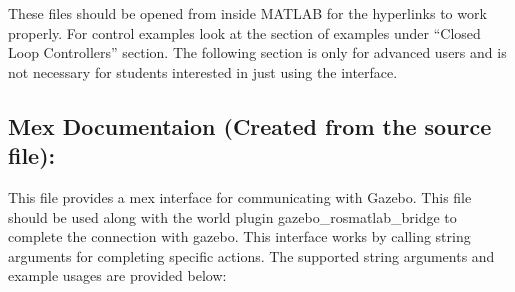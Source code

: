 \documentclass[letterpaper,10pt]{article}
\begin{document}
These files should be opened from inside MATLAB for the hyperlinks to work properly. For control examples look at the section of examples under ``Closed Loop Controllers'' section. The following section is only for advanced users and is not necessary for students interested in just using the interface.
  
\subsection{Mex Documentaion (Created from the source
file):}\label{mex-documentaion-created-from-the-source-file}

This file provides a mex interface for communicating with Gazebo. This
file should be used along with the world plugin
gazebo\_rosmatlab\_bridge to complete the connection with gazebo. This
interface works by calling string arguments for completing specific
actions. The supported string arguments and example usages are provided
below: 
\end{document}
